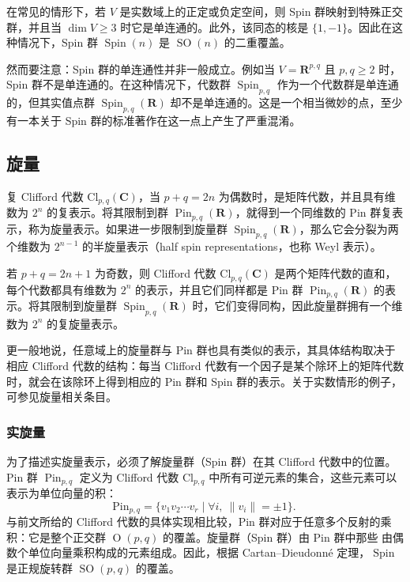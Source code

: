 在常见的情形下，若 $V$ 是实数域上的正定或负定空间，则 Spin 群映射到特殊正交群，并且当 $\dim V \geq 3$ 时它是单连通的。此外，该同态的核是 $\{1,-1\}$。因此在这种情况下，Spin 群 $\operatorname{Spin}(n)$ 是 $\operatorname{SO}(n)$ 的二重覆盖。

然而要注意：Spin 群的单连通性并非一般成立。例如当 $V = \mathbf{R}^{p,q}$ 且 $p, q \geq 2$ 时，Spin 群不是单连通的。在这种情况下，代数群 $\operatorname{Spin}_{p,q}$ 作为一个代数群是单连通的，但其实值点群 $\operatorname{Spin}_{p,q}(\mathbf{R})$ 却不是单连通的。这是一个相当微妙的点，至少有一本关于 Spin 群的标准著作在这一点上产生了严重混淆。
\subsection{旋量}
复 Clifford 代数 $\mathrm{Cl}_{p,q}(\mathbf{C})$，当 $p+q = 2n$ 为偶数时，是矩阵代数，并且具有维数为 $2^{n}$ 的复表示。将其限制到群 $\operatorname{Pin}_{p,q}(\mathbf{R})$，就得到一个同维数的 Pin 群复表示，称为旋量表示。如果进一步限制到旋量群 $\operatorname{Spin}_{p,q}(\mathbf{R})$，那么它会分裂为两个维数为 $2^{n-1}$ 的半旋量表示（half spin representations，也称 Weyl 表示）。

若 $p+q = 2n+1$ 为奇数，则 Clifford 代数 $\mathrm{Cl}_{p,q}(\mathbf{C})$ 是两个矩阵代数的直和，每个代数都具有维数为 $2^{n}$ 的表示，并且它们同样都是 Pin 群 $\operatorname{Pin}_{p,q}(\mathbf{R})$ 的表示。将其限制到旋量群 $\operatorname{Spin}_{p,q}(\mathbf{R})$ 时，它们变得同构，因此旋量群拥有一个维数为 $2^{n}$ 的复旋量表示。

更一般地说，任意域上的旋量群与 Pin 群也具有类似的表示，其具体结构取决于相应 Clifford 代数的结构：每当 Clifford 代数有一个因子是某个除环上的矩阵代数时，就会在该除环上得到相应的 Pin 群和 Spin 群的表示。关于实数情形的例子，可参见旋量相关条目。
\subsubsection{实旋量}
为了描述实旋量表示，必须了解旋量群（Spin 群）在其 Clifford 代数中的位置。Pin 群 $\operatorname{Pin}_{p,q}$ 定义为 Clifford 代数 $\mathrm{Cl}_{p,q}$ 中所有可逆元素的集合，这些元素可以表示为单位向量的积：
$$
\mathrm{Pin}_{p,q} = \{ v_1 v_2 \cdots v_r \mid \forall i, \ \|v_i\| = \pm 1 \}.~
$$
与前文所给的 Clifford 代数的具体实现相比较，Pin 群对应于任意多个反射的乘积：它是整个正交群 $\operatorname{O}(p,q)$ 的覆盖。旋量群（Spin 群）由 Pin 群中那些 由偶数个单位向量乘积构成的元素组成。因此，根据 Cartan–Dieudonné 定理，$\operatorname{Spin}$ 是正规旋转群 $\operatorname{SO}(p,q)$ 的覆盖。

